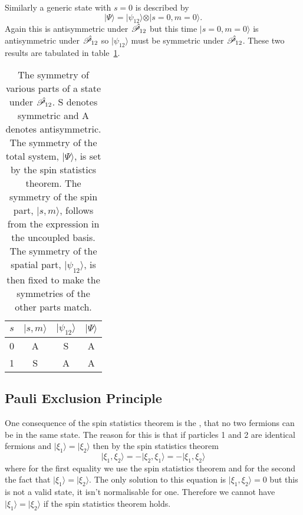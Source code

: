 \documentclass[a4paper]{article}
\renewcommand{\ket}[1]{\vert {#1} \rangle}
\newcommand{\parity}{\mathscr{P}}
\newcommand{\tensorProd}{\otimes}
\theoremstyle{definition}
\begin{document}
    Similarly a generic state with \(s=0\) is described by
    \[\ket{\Psi} = \ket{\psi_{12}}\tensorProd\ket{s=0, m=0}.\]
    Again this is antisymmetric under \(\operator{\parity_{12}}\) but this time \(\ket{s=0, m=0}\) is antisymmetric under \(\operator{\parity_{12}}\) so \(\ket{\psi_{12}}\) must be symmetric under \(\operator{\parity_{12}}\).
    These two results are tabulated in table~\ref{tab:symmetry under swapping of particles}.
    \begin{table}[ht]
        \centering
        \begin{tabular}{cccc}\hline
            \(s\) & \(\ket{s, m}\) & \(\ket{\psi_{12}}\) & \(\ket{\Psi}\)\\\hline
            0 & A & S & A\\
            1 & S & A & A\\\hline
        \end{tabular}
        \caption{The symmetry of various parts of a state under \(\operator{\parity_{12}}\). S denotes symmetric and A denotes antisymmetric. The symmetry of the total system, \(\ket{\Psi}\), is set by the spin statistics theorem. The symmetry of the spin part, \(\ket{s, m}\), follows from the expression in the uncoupled basis. The symmetry of the spatial part, \(\ket{\psi_{12}}\), is then fixed to make the symmetries of the other parts match.}
        \label{tab:symmetry under swapping of particles}
    \end{table}
    \subsection{Pauli Exclusion Principle}
    One consequence of the spin statistics theorem is the , that no two fermions can be in the same state.
    The reason for this is that if particles 1 and 2 are identical fermions and \(\ket{\xi_1} = \ket{\xi_2}\) then by the spin statistics theorem
    \[\ket{\xi_1, \xi_2} = -\ket{\xi_2, \xi_1} = -\ket{\xi_1, \xi_2}\]
    where for the first equality we use the spin statistics theorem and for the second the fact that \(\ket{\xi_1} = \ket{\xi_2}\).
    The only solution to this equation is \(\ket{\xi_1, \xi_2} = 0\) but this is not a valid state, it isn't normalisable for one.
    Therefore we cannot have \(\ket{\xi_1} = \ket{\xi_2}\) if the spin statistics theorem holds.
    
\end{document}
